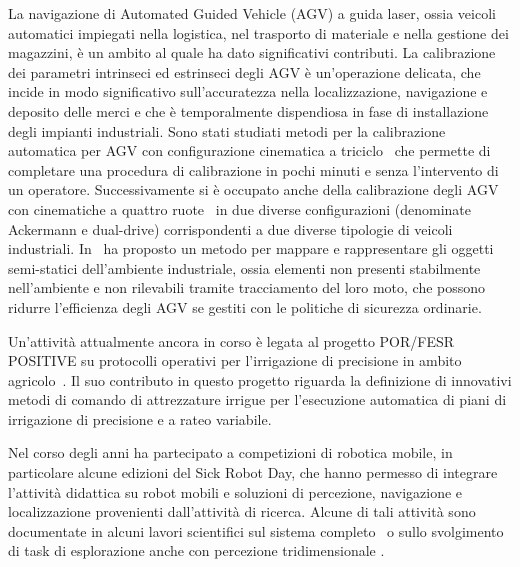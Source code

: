 \documentclass[11pt]{article}
\begin{document}
La navigazione di Automated Guided Vehicle (AGV) a guida laser, ossia veicoli automatici impiegati nella logistica, nel trasporto di materiale
e nella gestione dei magazzini, \`e un ambito al quale ha dato significativi contributi. 
La calibrazione dei parametri intrinseci ed estrinseci degli AGV \`e un'operazione delicata, che incide in modo significativo sull'accuratezza nella localizzazione,  navigazione e deposito delle merci e che \`e temporalmente dispendiosa in fase di installazione degli impianti industriali. 
Sono stati studiati metodi per la calibrazione automatica per AGV con configurazione cinematica a triciclo~\cite{kallasi2017ras}
che permette di completare una procedura di calibrazione in pochi minuti e senza l'intervento di un operatore. 
Successivamente si \`e occupato anche della calibrazione degli AGV con cinematiche a quattro ruote~\cite{galasso2019rcim} in due diverse configurazioni (denominate Ackermann e dual-drive) corrispondenti a due diverse tipologie di veicoli industriali. 
In~\cite{lodirizzini2007icinco} ha proposto un metodo per mappare e rappresentare gli oggetti semi-statici dell'ambiente industriale, ossia elementi non presenti stabilmente 
nell'ambiente e non rilevabili tramite tracciamento del loro moto, che possono ridurre l'efficienza degli AGV se gestiti con le politiche di sicurezza ordinarie. 

Un'attivit\`a attualmente ancora in corso \`e legata al progetto POR/FESR POSITIVE su protocolli operativi per l'irrigazione di precisione in ambito agricolo~\cite{amoretti2020smartsys}. 
Il suo contributo in questo progetto riguarda la definizione di innovativi metodi di comando di attrezzature irrigue per l'esecuzione automatica di piani di irrigazione di precisione e a rateo variabile. 

Nel corso degli anni ha partecipato a competizioni di robotica mobile, in particolare alcune edizioni del Sick Robot Day, che hanno permesso di integrare l'attivit\`a didattica su robot mobili e soluzioni di percezione, navigazione e localizzazione provenienti dall'attivit\`a di ricerca. 
Alcune di tali attivit\`a sono documentate in alcuni lavori scientifici sul sistema completo~\cite{cigolini2014jamris} o sullo svolgimento di task di esplorazione anche con percezione tridimensionale \cite{valeriani2013acra}. 
\end{document}
